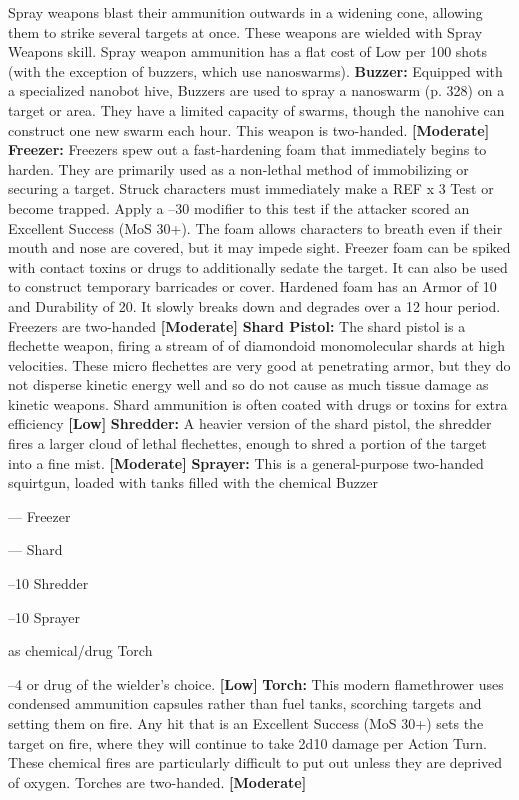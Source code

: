 Spray weapons blast their ammunition outwards in a 
widening cone, allowing them to strike several targets 
at once. These weapons are wielded with Spray Weapons
skill. Spray weapon ammunition has a flat cost
of Low per 100 shots (with the exception of buzzers, 
which use nanoswarms).
\textbf{Buzzer:} Equipped with a specialized nanobot hive, 
Buzzers are used to spray a nanoswarm (p. 328) on a 
target or area. They have a limited capacity of swarms, 
though the nanohive can construct one new swarm 
each hour. This weapon is two-handed. \textbf{[Moderate]}
\textbf{Freezer:} Freezers spew out a fast-hardening foam 
that immediately begins to harden. They are primarily
used as a non-lethal method of immobilizing or
securing a target. Struck characters must immediately 
make a REF x 3 Test or become trapped. Apply a –30 
modifier to this test if the attacker scored an Excellent
Success (MoS 30+). The foam allows characters
to breath even if their mouth and nose are covered, 
but it may impede sight. Freezer foam can be spiked 
with contact toxins or drugs to additionally sedate 
the target. It can also be used to construct temporary 
barricades or cover. Hardened foam has an Armor of 
10 and Durability of 20. It slowly breaks down and 
degrades over a 12 hour period. Freezers are two-handed
\textbf{[Moderate]}
\textbf{Shard Pistol:} The shard pistol is a flechette weapon, 
firing a stream of of diamondoid monomolecular 
shards at high velocities. These micro flechettes are 
very good at penetrating armor, but they do not disperse
kinetic energy well and so do not cause as much
tissue damage as kinetic weapons. Shard ammunition 
is often coated with drugs or toxins for extra efficiency
\textbf{[Low]}
\textbf{Shredder:} A heavier version of the shard pistol, 
the shredder fires a larger cloud of lethal flechettes, 
enough to shred a portion of the target into a fine 
mist. \textbf{[Moderate]}
\textbf{Sprayer:} This is a general-purpose two-handed 
squirtgun, loaded with tanks filled with the chemical 
Buzzer

—
Freezer

—
Shard

–10
Shredder

–10
Sprayer

as chemical/drug
Torch

–4
or drug of the wielder's choice. \textbf{[Low]}
\textbf{Torch:} This modern flamethrower uses condensed 
ammunition capsules rather than fuel tanks, scorching
targets and setting them on fire. Any hit that is
an Excellent Success (MoS 30+) sets the target on 
fire, where they will continue to take 2d10 damage 
per Action Turn. These chemical fires are particularly 
difficult to put out unless they are deprived of oxygen. 
Torches are two-handed. \textbf{[Moderate]}

